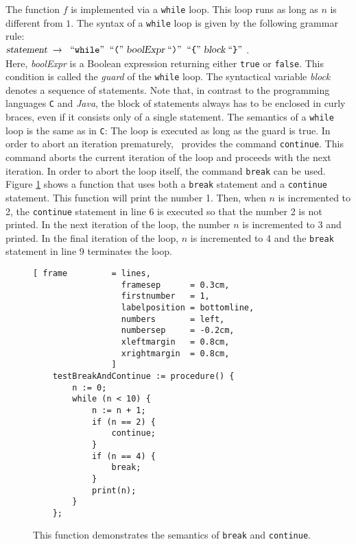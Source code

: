 The function $f$ is implemented via a \texttt{while} loop.  This loop runs as long as $n$
is different from $1$.  The syntax of a \texttt{while} loop is given by the following
grammar rule:
\\[0.2cm]
\hspace*{1.3cm}
$\textsl{statement} \;\rightarrow\; \;\mbox{``\texttt{while}''}\; \;\mbox{``\texttt{(}''}\; \textsl{boolExpr} \;\mbox{``\texttt{)}''}\;
 \;\mbox{``\texttt{\{}''}\;  \textsl{block} \;\mbox{``\texttt{\}}''}\; 
$.
\\[0.2cm]
Here, \textsl{boolExpr} is a Boolean expression returning either \texttt{true} or
\texttt{false}.  This condition is called the \emph{guard} of the \texttt{while} loop.
The syntactical variable \textsl{block} denotes a sequence of statements.  Note that, 
in contrast to the programming languages \texttt{C} and \textsl{Java}, the
block of statements always has to be enclosed in curly braces, even if it consists only of a
single statement.  The semantics of a \texttt{while} loop is the same as in \texttt{C}:
The loop is executed as long as the guard is true.  In order to abort an iteration
prematurely, \setlx\ provides the command \texttt{continue}.  This command aborts the
current iteration of the loop and proceeds with the next iteration.  In order to abort the
loop itself, the command \texttt{break} can be used.  Figure \ref{fig:break-and-continue.stlx} shows
a function that uses both a \texttt{break} statement and a \texttt{continue} statement.  This
function will print the number 1.  Then, when $n$ is incremented to 2, the \texttt{continue}
statement in line 6 is executed so that the number 2 is not printed.  In the next iteration of the
loop, the number $n$ is incremented to 3 and printed.  In the final iteration of the loop, $n$ is
incremented to 4 and the \texttt{break} statement in line 9 terminates the loop.


\begin{figure}[!ht]
\centering
\begin{Verbatim}[ frame         = lines, 
                  framesep      = 0.3cm, 
                  firstnumber   = 1,
                  labelposition = bottomline,
                  numbers       = left,
                  numbersep     = -0.2cm,
                  xleftmargin   = 0.8cm,
                  xrightmargin  = 0.8cm,
                ]
    testBreakAndContinue := procedure() {
        n := 0;
        while (n < 10) {
            n := n + 1;
            if (n == 2) {
                continue;
            }
            if (n == 4) {
                break;
            }
            print(n);
        }
    };
\end{Verbatim}
\vspace*{-0.3cm}
\caption{This function demonstrates the semantics of \texttt{break} and \texttt{continue}.}
\label{fig:break-and-continue.stlx}
\end{figure}


